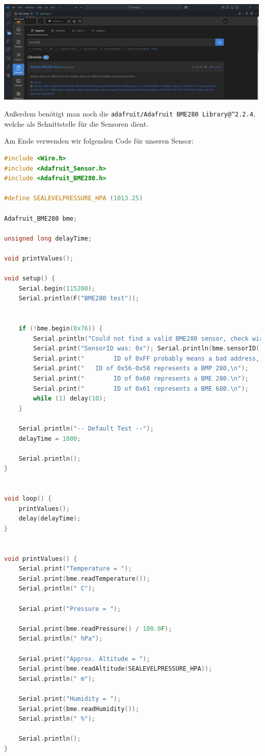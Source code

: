 \documentclass[
    headings=optiontotocandhead,%
    twoside,
    numbers=noenddot,%
    12pt, %
    titlepage, %
    parskip=full, %
    listof=leveldown, 
    numbers=noenddot, %
    a4paper,DIV=14,
    BCOR=15mm,
]{scrbook}
\newcommand{\passthrough}[1]{#1}
\let\origfigure=\figure
\let\endorigfigure=\endfigure
\renewenvironment{figure}[1][]{%
   \origfigure[H]
}{%
   \endorigfigure
}
\begin{document}
\begin{figure}
\centering
\includegraphics[width=5.20833in,height=\textheight]{img/Kampl/BME-Library.png}
\caption{BME-Library}
\end{figure}

Außerdem benötigt man noch die
\passthrough{\lstinline!adafruit/Adafruit BME280 Library@^2.2.4!},
welche als Schnittstelle für die Sensoren dient.

Am Ende verwenden wir folgenden Code für unseren Sensor:

\begin{lstlisting}[language={C++}, caption={BME Testprogramm}]
#include <Wire.h>
#include <Adafruit_Sensor.h>
#include <Adafruit_BME280.h>

#define SEALEVELPRESSURE_HPA (1013.25)

Adafruit_BME280 bme; 

unsigned long delayTime;

void printValues();

void setup() {
    Serial.begin(115200);
    Serial.println(F("BME280 test"));

    
    if (!bme.begin(0x76)) {
        Serial.println("Could not find a valid BME280 sensor, check wiring, address, sensor ID!");
        Serial.print("SensorID was: 0x"); Serial.println(bme.sensorID(),16);
        Serial.print("        ID of 0xFF probably means a bad address, a BMP 180 or BMP 085\n");
        Serial.print("   ID of 0x56-0x58 represents a BMP 280,\n");
        Serial.print("        ID of 0x60 represents a BME 280.\n");
        Serial.print("        ID of 0x61 represents a BME 680.\n");
        while (1) delay(10);
    }
    
    Serial.println("-- Default Test --");
    delayTime = 1000;

    Serial.println();
}


void loop() { 
    printValues();
    delay(delayTime);
}


void printValues() {
    Serial.print("Temperature = ");
    Serial.print(bme.readTemperature());
    Serial.println(" C");

    Serial.print("Pressure = ");

    Serial.print(bme.readPressure() / 100.0F);
    Serial.println(" hPa");

    Serial.print("Approx. Altitude = ");
    Serial.print(bme.readAltitude(SEALEVELPRESSURE_HPA));
    Serial.println(" m");

    Serial.print("Humidity = ");
    Serial.print(bme.readHumidity());
    Serial.println(" %");

    Serial.println();
}
\end{lstlisting}
\end{document}
